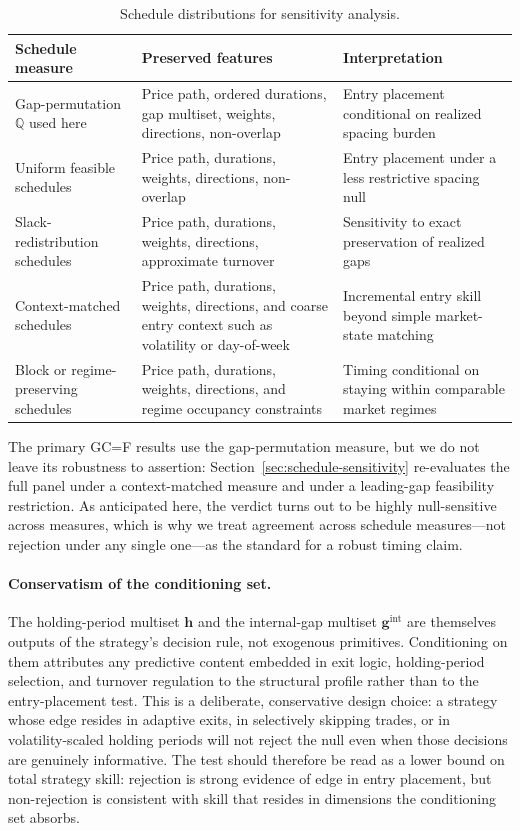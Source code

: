 \documentclass[preprint,12pt]{elsarticle}
\theoremstyle{definition}
\begin{document}
\begin{table}[H]
\centering
\caption{Schedule distributions for sensitivity analysis.}
\label{tab:schedule_measures}
\small
\renewcommand{\arraystretch}{1.12}
\begin{tabular}{@{}>{\raggedright\arraybackslash}p{}>{\raggedright\arraybackslash}p{}>{\raggedright\arraybackslash}p{}@{}}
\toprule
Schedule measure & Preserved features & Interpretation \\
\midrule
Gap-permutation $\mathbb{Q}$ used here & Price path, ordered durations, gap multiset, weights, directions, non-overlap & Entry placement conditional on realized spacing burden \\
Uniform feasible schedules & Price path, durations, weights, directions, non-overlap & Entry placement under a less restrictive spacing null \\
Slack-redistribution schedules & Price path, durations, weights, directions, approximate turnover & Sensitivity to exact preservation of realized gaps \\
Context-matched schedules & Price path, durations, weights, directions, and coarse entry context such as volatility or day-of-week & Incremental entry skill beyond simple market-state matching \\
Block or regime-preserving schedules & Price path, durations, weights, directions, and regime occupancy constraints & Timing conditional on staying within comparable market regimes \\
\bottomrule
\end{tabular}
\end{table}

The primary GC=F results use the gap-permutation measure, but we do not leave its robustness to assertion: Section~\ref{sec:schedule-sensitivity} re-evaluates the full panel under a context-matched measure and under a leading-gap feasibility restriction. As anticipated here, the verdict turns out to be highly null-sensitive across measures, which is why we treat agreement across schedule measures---not rejection under any single one---as the standard for a robust timing claim.

\paragraph{Conservatism of the conditioning set.} The holding-period multiset $\mathbf{h}$ and the internal-gap multiset $\mathbf{g}^{\mathrm{int}}$ are themselves outputs of the strategy's decision rule, not exogenous primitives. Conditioning on them attributes any predictive content embedded in exit logic, holding-period selection, and turnover regulation to the structural profile rather than to the entry-placement test. This is a deliberate, conservative design choice: a strategy whose edge resides in adaptive exits, in selectively skipping trades, or in volatility-scaled holding periods will not reject the null even when those decisions are genuinely informative. The test should therefore be read as a lower bound on total strategy skill: rejection is strong evidence of edge in entry placement, but non-rejection is consistent with skill that resides in dimensions the conditioning set absorbs.
\end{document}
